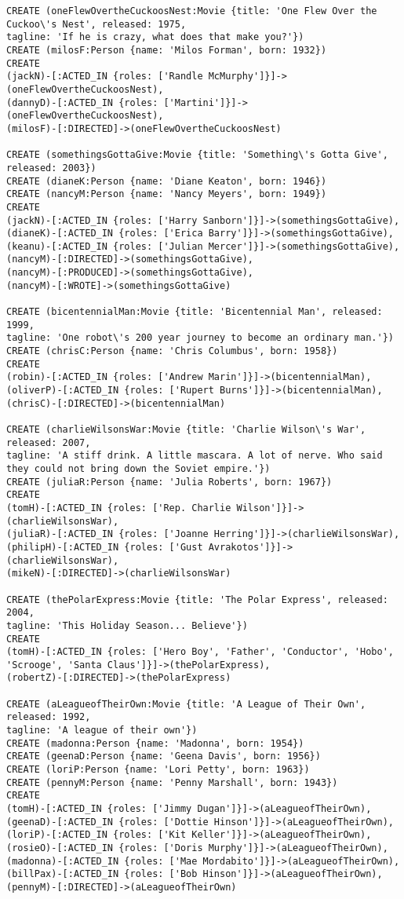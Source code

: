 \begin{lstlisting}
CREATE (oneFlewOvertheCuckoosNest:Movie {title: 'One Flew Over the Cuckoo\'s Nest', released: 1975,
tagline: 'If he is crazy, what does that make you?'})
CREATE (milosF:Person {name: 'Milos Forman', born: 1932})
CREATE
(jackN)-[:ACTED_IN {roles: ['Randle McMurphy']}]->(oneFlewOvertheCuckoosNest),
(dannyD)-[:ACTED_IN {roles: ['Martini']}]->(oneFlewOvertheCuckoosNest),
(milosF)-[:DIRECTED]->(oneFlewOvertheCuckoosNest)

CREATE (somethingsGottaGive:Movie {title: 'Something\'s Gotta Give', released: 2003})
CREATE (dianeK:Person {name: 'Diane Keaton', born: 1946})
CREATE (nancyM:Person {name: 'Nancy Meyers', born: 1949})
CREATE
(jackN)-[:ACTED_IN {roles: ['Harry Sanborn']}]->(somethingsGottaGive),
(dianeK)-[:ACTED_IN {roles: ['Erica Barry']}]->(somethingsGottaGive),
(keanu)-[:ACTED_IN {roles: ['Julian Mercer']}]->(somethingsGottaGive),
(nancyM)-[:DIRECTED]->(somethingsGottaGive),
(nancyM)-[:PRODUCED]->(somethingsGottaGive),
(nancyM)-[:WROTE]->(somethingsGottaGive)

CREATE (bicentennialMan:Movie {title: 'Bicentennial Man', released: 1999,
tagline: 'One robot\'s 200 year journey to become an ordinary man.'})
CREATE (chrisC:Person {name: 'Chris Columbus', born: 1958})
CREATE
(robin)-[:ACTED_IN {roles: ['Andrew Marin']}]->(bicentennialMan),
(oliverP)-[:ACTED_IN {roles: ['Rupert Burns']}]->(bicentennialMan),
(chrisC)-[:DIRECTED]->(bicentennialMan)

CREATE (charlieWilsonsWar:Movie {title: 'Charlie Wilson\'s War', released: 2007,
tagline: 'A stiff drink. A little mascara. A lot of nerve. Who said they could not bring down the Soviet empire.'})
CREATE (juliaR:Person {name: 'Julia Roberts', born: 1967})
CREATE
(tomH)-[:ACTED_IN {roles: ['Rep. Charlie Wilson']}]->(charlieWilsonsWar),
(juliaR)-[:ACTED_IN {roles: ['Joanne Herring']}]->(charlieWilsonsWar),
(philipH)-[:ACTED_IN {roles: ['Gust Avrakotos']}]->(charlieWilsonsWar),
(mikeN)-[:DIRECTED]->(charlieWilsonsWar)

CREATE (thePolarExpress:Movie {title: 'The Polar Express', released: 2004,
tagline: 'This Holiday Season... Believe'})
CREATE
(tomH)-[:ACTED_IN {roles: ['Hero Boy', 'Father', 'Conductor', 'Hobo', 'Scrooge', 'Santa Claus']}]->(thePolarExpress),
(robertZ)-[:DIRECTED]->(thePolarExpress)

CREATE (aLeagueofTheirOwn:Movie {title: 'A League of Their Own', released: 1992,
tagline: 'A league of their own'})
CREATE (madonna:Person {name: 'Madonna', born: 1954})
CREATE (geenaD:Person {name: 'Geena Davis', born: 1956})
CREATE (loriP:Person {name: 'Lori Petty', born: 1963})
CREATE (pennyM:Person {name: 'Penny Marshall', born: 1943})
CREATE
(tomH)-[:ACTED_IN {roles: ['Jimmy Dugan']}]->(aLeagueofTheirOwn),
(geenaD)-[:ACTED_IN {roles: ['Dottie Hinson']}]->(aLeagueofTheirOwn),
(loriP)-[:ACTED_IN {roles: ['Kit Keller']}]->(aLeagueofTheirOwn),
(rosieO)-[:ACTED_IN {roles: ['Doris Murphy']}]->(aLeagueofTheirOwn),
(madonna)-[:ACTED_IN {roles: ['Mae Mordabito']}]->(aLeagueofTheirOwn),
(billPax)-[:ACTED_IN {roles: ['Bob Hinson']}]->(aLeagueofTheirOwn),
(pennyM)-[:DIRECTED]->(aLeagueofTheirOwn)


\end{lstlisting}

